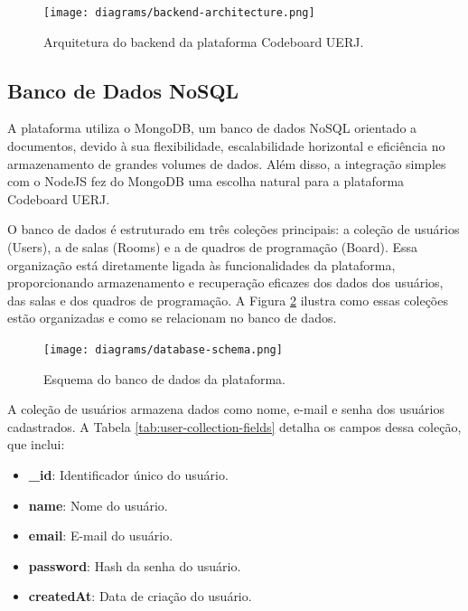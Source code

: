 \begin{figure}[H]
    \centering
    \caption{Arquitetura do backend da plataforma Codeboard UERJ.}
    \label{fig:backend-architecture}
    \texttt{[image: diagrams/backend-architecture.png]}
\end{figure}


\subsection{Banco de Dados NoSQL}

A plataforma utiliza o MongoDB, um banco de dados NoSQL orientado a documentos, devido à sua flexibilidade, escalabilidade horizontal e eficiência no armazenamento de grandes volumes de dados. Além disso, a integração simples com o NodeJS fez do MongoDB uma escolha natural para a plataforma Codeboard UERJ.

O banco de dados é estruturado em três coleções principais: a coleção de usuários (Users), a de salas (Rooms) e a de quadros de programação (Board). Essa organização está diretamente ligada às funcionalidades da plataforma, proporcionando armazenamento e recuperação eficazes dos dados dos usuários, das salas e dos quadros de programação. A Figura \ref{fig:database-schema} ilustra como essas coleções estão organizadas e como se relacionam no banco de dados.

\begin{figure}[H]
    \centering
    \caption{Esquema do banco de dados da plataforma.}
    \label{fig:database-schema}
    \texttt{[image: diagrams/database-schema.png]}
\end{figure}

A coleção de usuários armazena dados como nome, e-mail e senha dos usuários cadastrados. A Tabela \ref{tab:user-collection-fields} detalha os campos dessa coleção, que inclui:

\begin{itemize}
    \item \textbf{\_id}: Identificador único do usuário.
    \item \textbf{name}: Nome do usuário.
    \item \textbf{email}: E-mail do usuário.
    \item \textbf{password}: Hash da senha do usuário.
    \item \textbf{createdAt}: Data de criação do usuário.
\end{itemize}

